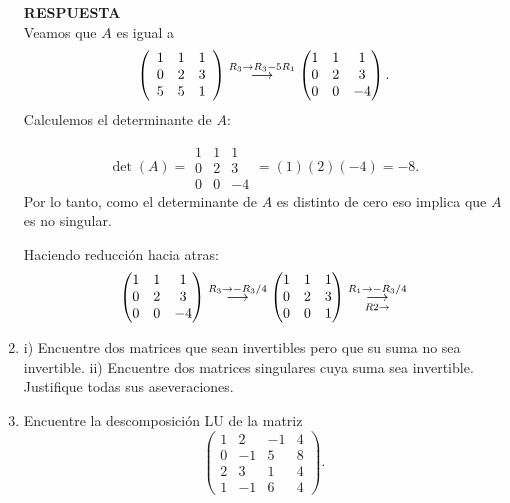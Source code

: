 \documentclass[11pt,letterpaper]{article}
\newcommand{\res}{\textbf{RESPUESTA}\\}
\newcommand{\grstep}[2][\relax]{%
   \ensuremath{\mathrel{
       {\mathop{\longrightarrow}\limits^{#2\mathstrut}_{
                                     \begin{subarray}{l} #1 \end{subarray}}}}}}
\begin{document}
\begin{enumerate}
\res
Veamos que $A$ es igual a 
\begin{equation*}
\left(\begin{array}{rrr}
 1 & 1 & 1\\
 0 & 2 & 3\\
 5 & 5 & 1
\end{array}\right) %
\grstep[]{R_3 \rightarrow R_3-5R_1}
%
\begin{pmatrix}
 1 & 1 & 1\\
 0 & 2 & 3\\
 0 & 0 & -4
\end{pmatrix}.
\end{equation*}
Calculemos el determinante de $A$:

$$ \det(A)=\begin{array}{|rrr|}
 1 & 1 & 1\\
 0 & 2 & 3\\
 0 & 0 & -4
\end{array}=(1)(2)(-4)=-8.$$
Por lo tanto, como el determinante de $A$ es distinto de cero eso implica que $A$ es no singular. 

Haciendo reducción hacia atras:
\begin{equation*}
\begin{pmatrix}
 1 & 1 & 1\\
 0 & 2 & 3\\
 0 & 0 & -4
\end{pmatrix}%
\grstep[]{R_3 \rightarrow -R_3/4}
%
\begin{pmatrix}
 1 & 1 & 1\\
 0 & 2 & 3\\
 0 & 0 & 1
\end{pmatrix}%
\grstep[R2 \rightarrow ]{R_1 \rightarrow -R_3/4}
%
\end{equation*}

\item i) Encuentre dos matrices que sean invertibles pero que su suma no sea invertible. ii) Encuentre dos matrices singulares cuya suma sea invertible. Justifique todas sus aseveraciones.


\item Encuentre la descomposición LU de la matriz
\begin{equation*}
\left(\begin{array}{rrrr}
 1 &  2 & -1 & 4\\
 0 & -1 &  5 & 8\\
 2 &  3 &  1 & 4\\
 1 & -1 &  6 & 4
\end{array} \right).
\end{equation*}


\end{enumerate}
\end{document}
